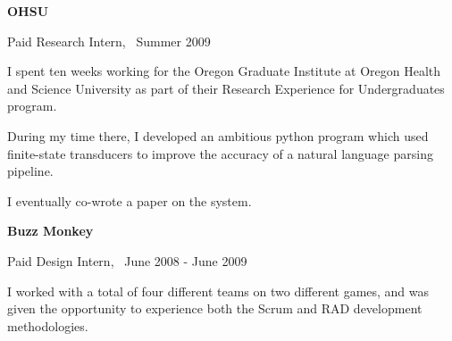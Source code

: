 \documentclass[10pt,letterpaper]{article}
\newenvironment{topic}[1]{
\begin{minipage}[t]{0.15\linewidth}\begin{flushleft}\begin{flushright}\textbf{#1}\end{flushright}\end{flushleft}\end{minipage}\hspace{1em}\vrule\hspace{1em}\begin{minipage}[t]{0.80\linewidth}\begin{flushright}\begin{flushleft}
}{
\end{flushleft}\end{flushright}\end{minipage}\vspace{1em}
}
\begin{document}
\vspace{1.5em}
\begin{topic}{OHSU}
  Paid Research Intern, \ Summer 2009

  \vspace{1em}

  I spent ten weeks working for the Oregon Graduate Institute at Oregon Health
  and Science University as part of their Research Experience for
  Undergraduates program.
  
  \vspace{1em}
  
  During my time there, I developed an ambitious python program which used
  finite-state transducers to improve the accuracy of a natural language
  parsing pipeline.

  \vspace{1em}

  I eventually co-wrote a paper on the system.
\end{topic}

\vspace{1.5em}
\begin{topic}{Buzz Monkey}
  Paid Design Intern, \ June 2008 - June 2009

  \vspace{1em}

  I worked with a total of four different teams on two different
  games, and was given the opportunity to experience both the Scrum
  and RAD development methodologies.
\end{topic}
\end{document}
